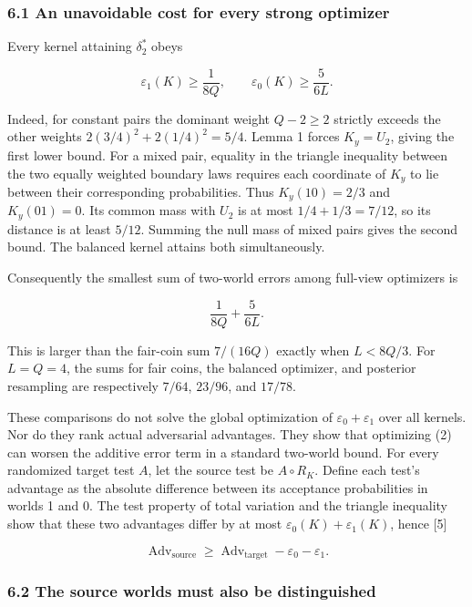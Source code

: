 \documentclass[
]{article}
\begin{document}
\subsubsection{6.1 An unavoidable cost for every strong
optimizer}\label{an-unavoidable-cost-for-every-strong-optimizer}

Every kernel attaining \(\delta_2^*\) obeys

\[
\varepsilon_1(K)\ge\frac1{8Q},\qquad
\varepsilon_0(K)\ge\frac5{6L}.
\tag{15}
\]

Indeed, for constant pairs the dominant weight \(Q-2\ge2\) strictly
exceeds the other weights \(2(3/4)^2+2(1/4)^2=5/4\). Lemma 1 forces
\(K_y=U_2\), giving the first lower bound. For a mixed pair, equality in
the triangle inequality between the two equally weighted boundary laws
requires each coordinate of \(K_y\) to lie between their corresponding
probabilities. Thus \(K_y(10)=2/3\) and \(K_y(01)=0\). Its common mass
with \(U_2\) is at most \(1/4+1/3=7/12\), so its distance is at least
\(5/12\). Summing the null mass of mixed pairs gives the second bound.
The balanced kernel attains both simultaneously.

Consequently the smallest sum of two-world errors among full-view
optimizers is

\[
\frac1{8Q}+\frac5{6L}.
\tag{16}
\]

This is larger than the fair-coin sum \(7/(16Q)\) exactly when
\(L<8Q/3\). For \(L=Q=4\), the sums for fair coins, the balanced
optimizer, and posterior resampling are respectively \(7/64\),
\(23/96\), and \(17/78\).

These comparisons do not solve the global optimization of
\(\varepsilon_0+\varepsilon_1\) over all kernels. Nor do they rank
actual adversarial advantages. They show that optimizing (2) can worsen
the additive error term in a standard two-world bound. For every
randomized target test \(A\), let the source test be \(A\circ R_K\).
Define each test's advantage as the absolute difference between its
acceptance probabilities in worlds 1 and 0. The test property of total
variation and the triangle inequality show that these two advantages
differ by at most \(\varepsilon_0(K)+\varepsilon_1(K)\), hence {[}5{]}

\[
\operatorname{Adv}_{\mathrm{source}}\ge
\operatorname{Adv}_{\mathrm{target}}-\varepsilon_0-\varepsilon_1.
\tag{17}
\]

\subsubsection{6.2 The source worlds must also be
distinguished}\label{the-source-worlds-must-also-be-distinguished}
\end{document}
